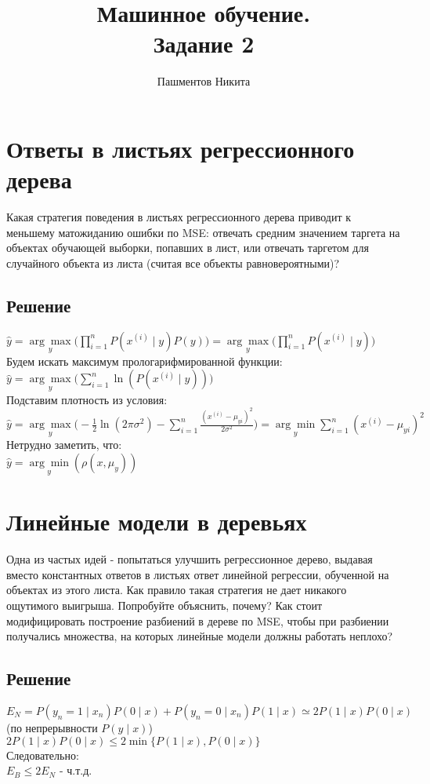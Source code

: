 \documentclass[11pt]{article}
\title{\textbf{Машинное обучение.\\ Задание 2}}
\author{Пашментов Никита}
\date{}
\begin{document}
\maketitle

\section{Ответы в листьях регрессионного дерева}
Какая стратегия поведения в листьях регрессионного дерева приводит к меньшему матожиданию ошибки по MSE: отвечать средним значением таргета на объектах обучающей выборки, попавших в лист, или отвечать таргетом для случайного объекта из листа (считая все объекты равновероятными)?

\subsection{Решение}
$\hat{y} = \underset{y}{\arg\max}{\big(\prod\limits_{i = 1}^{n}{P(x^{(i)} \mid y)P(y)}}\big) = \underset{y}{\arg\max}{\big(\prod\limits_{i = 1}^{n}{P(x^{(i)} \mid y)}}\big)$\\
Будем искать максимум прологарифмированной функции:\\
$\hat{y} = \underset{y}{\arg\max}{\big(\sum\limits_{i = 1}^{n}{\ln{(P(x^{(i)} \mid y))}}}\big)$\\
Подставим плотность из условия:\\
$\hat{y} = \underset{y}{\arg\max}{\big(-\frac{1}{2} \ln{(2\pi\sigma^{2}) - \sum\limits_{i = 1}^{n}{\frac{(x^{(i)} - \mu_{yi})^{2}}{2\sigma^{2}}}} \big)} = \underset{y}{\arg\min}{\sum\limits_{i = 1}^{n}{(x^{(i)} - \mu_{yi}) ^ {2}}}$\\
Нетрудно заметить, что:\\
$\hat{y} = \underset{y}{\arg\min}{(\rho(x, \mu_y))}$

\section{Линейные модели в деревьях}
Одна из частых идей - попытаться улучшить регрессионное дерево, выдавая вместо константных ответов в листьях ответ линейной регрессии, обученной на объектах из этого листа.
Как правило такая стратегия не дает никакого ощутимого выигрыша. Попробуйте объяснить, почему? Как стоит модифицировать построение разбиений в дереве по MSE, чтобы при
разбиении получались множества, на которых линейные модели должны работать неплохо?

\subsection{Решение}
$E_N = P(y_n = 1 \mid x_n)P(0\mid x) + P(y_n = 0 \mid x_n)P(1\mid x) \simeq 2P(1 \mid x)P(0 \mid x)$ (по непрерывности $P(y \mid x)$)\\
$2P(1 \mid x)P(0 \mid x) \leq 2\min\{P(1 \mid x), P(0 \mid x)\}$\\
Следовательно:\\
$E_B \leq 2E_N$ - ч.т.д.
\end{document}

